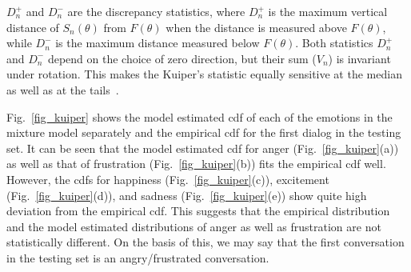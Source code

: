 \documentclass[10pt,journal,cspaper,compsoc]{IEEEtran}
\begin{document}
$D_{n}^{+}$ and $D_{n}^{-}$ are the discrepancy statistics, where $D_{n}^{+}$ is the maximum vertical distance of $S_{n}(\theta)$ from $F(\theta)$ when the distance is measured above $F(\theta)$, while $D_{n}^{-}$ is the maximum distance measured below $F(\theta)$. Both statistics $D_{n}^{+}$ and $D_{n}^{-}$ depend on the choice of zero direction, but their sum ($V_{n}$) is invariant under rotation. This makes the Kuiper's statistic equally sensitive at the median as well as at the tails~\cite{kuiper1960tests, mardia1972statistics}.

Fig.~\ref{fig_kuiper} shows the model estimated cdf of each of the emotions in the mixture model separately and the empirical cdf for the first dialog in the testing set. It can be seen that the model estimated cdf for anger (Fig.~\ref{fig_kuiper}(a)) as well as that of frustration (Fig.~\ref{fig_kuiper}(b)) fits the empirical cdf well. However, the cdfs for happiness (Fig.~\ref{fig_kuiper}(c)), excitement (Fig.~\ref{fig_kuiper}(d)), and sadness (Fig.~\ref{fig_kuiper}(e)) show quite high deviation from the empirical cdf. This suggests that the empirical distribution and the model estimated distributions of anger as well as frustration are not statistically different. On the basis of this, we may say that the first conversation in the testing set is an angry/frustrated conversation.
\end{document}
